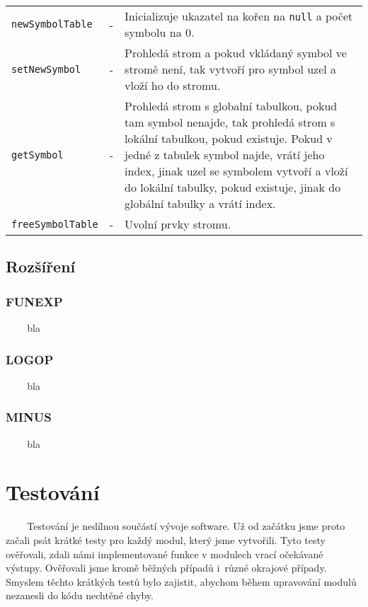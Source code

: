 \documentclass[12pt,a4paper,titlepage,final]{article}
\begin{document}
\begin{tabular}{llp{11.9cm}}
\texttt{newSymbolTable}  & - & Inicializuje ukazatel na kořen na \texttt{null} a počet symbolu na 0.\\
\texttt{setNewSymbol}    & - & Prohledá strom a pokud vkládaný symbol ve stromě není, 
                               tak vytvoří pro symbol uzel a vloží ho do stromu.\\                        
\texttt{getSymbol}       & - & Prohledá strom s globalní tabulkou, pokud tam symbol nenajde,  
                               tak prohledá strom s lokální tabulkou, pokud existuje.  
                               Pokud v jedné z tabulek symbol najde, vrátí jeho index, 
                               jinak uzel se symbolem vytvoří a vloží do lokální tabulky, 
                               pokud existuje, jinak do globální tabulky a vrátí index.\\
\texttt{freeSymbolTable} & - & Uvolní prvky stromu.\\
\end{tabular}
\subsection{Rozšíření}
\subsubsection{FUNEXP}
~ ~ ~bla
\subsubsection{LOGOP}
~ ~ ~bla
\subsubsection{MINUS}
~ ~ ~bla

\section{Testování} \label{testovani}
~ ~ ~Testování je nedílnou součástí vývoje software. Už od začátku jsme proto začali
psát krátké testy pro každý modul, který jsme vytvořili. Tyto testy ověřovali,
zdali námi implementované funkce v modulech vrací očekávané výstupy. Ověřovali 
jsme kromě běžných případů i~různé okrajové případy. Smyslem těchto krátkých testů 
bylo zajistit, abychom během upravování modulů nezanesli do kódu nechtěné chyby.
\end{document}

